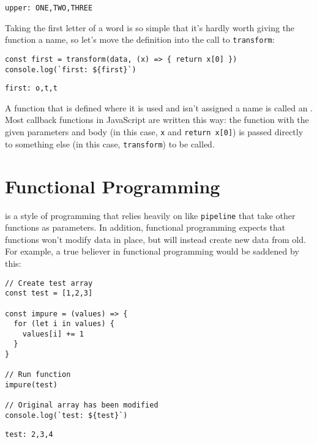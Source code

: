 \begin{verbatim}
upper: ONE,TWO,THREE
\end{verbatim}

Taking the first letter of a word is so simple that it's hardly worth giving the function a name,
so let's move the definition into the call to \texttt{transform}:

\begin{verbatim}
const first = transform(data, (x) => { return x[0] })
console.log(`first: ${first}`)
\end{verbatim}

\begin{verbatim}
first: o,t,t
\end{verbatim}

\noindent
A function that is defined where it is used and isn't assigned a name
is called an .
Most callback functions in JavaScript are written this way:
the function with the given parameters and body (in this case, \texttt{x} and \texttt{return x[0]})
is passed directly to something else (in this case, \texttt{transform}) to be called.

\section{Functional Programming}\label{s:callbacks-functional}

 is a style of programming
that relies heavily on  like \texttt{pipeline}
that take other functions as parameters.
In addition,
functional programming expects that functions won't modify data in place,
but will instead create new data from old.
For example,
a true believer in functional programming would be saddened by this:

\begin{verbatim}
// Create test array
const test = [1,2,3]

const impure = (values) => {
  for (let i in values) {
    values[i] += 1
  }
}

// Run function
impure(test)

// Original array has been modified
console.log(`test: ${test}`)
\end{verbatim}

\begin{verbatim}
test: 2,3,4
\end{verbatim}

